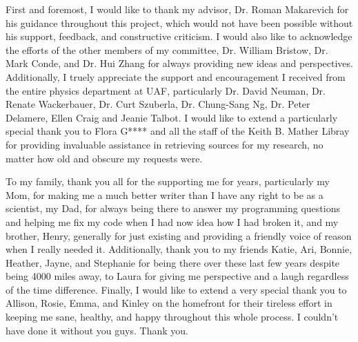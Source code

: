 
First and foremost, I would like to thank my advisor, Dr. Roman Makarevich for his guidance throughout this project, which would not have been possible without his support, feedback, and constructive criticism.  I would also like to acknowledge the efforts of the other members of my committee, Dr. William Bristow, Dr. Mark Conde, and Dr. Hui Zhang for always providing new ideas and perspectives.  Additionally, I truely appreciate the support and encouragement I received from the entire physics department at UAF, particularly Dr. David Neuman, Dr. Renate Wackerbauer, Dr. Curt Szuberla, Dr. Chung-Sang Ng, Dr. Peter Delamere, Ellen Craig and Jeanie Talbot.  I would like to extend a particularly special thank you to Flora G**** and all the staff of the Keith B. Mather Libray for providing invaluable assistance in retrieving sources for my research, no matter how old and obscure my requests were.  

To my family, thank you all for the supporting me for years, particularly my Mom, for making me a much better writer than I have any right to be as a scientist, my Dad, for always being there to answer my programming questions and helping me fix my code when I had now idea how I had broken it, and my brother, Henry, generally for just existing and providing a friendly voice of reason when I really needed it.  Additionally, thank you to my friends Katie, Ari, Bonnie, Heather, Jayne, and Stephanie for being there over these last few years despite being 4000 miles away, to Laura for giving me perspective and a laugh regardless of the time difference.  Finally, I would like to extend a very special thank you to Allison, Rosie, Emma, and Kinley on the homefront for their tireless effort in keeping me sane, healthy, and happy throughout this whole process.  I couldn't have done it without you guys.  Thank you.